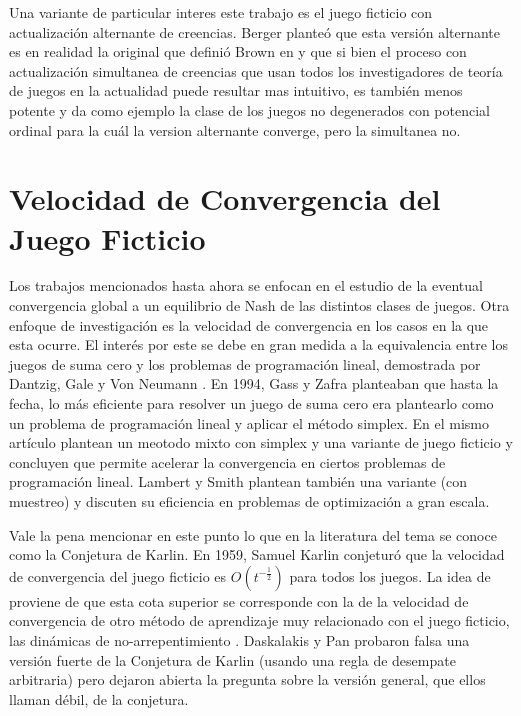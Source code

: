Una variante de particular interes este trabajo es el juego ficticio con actualización alternante de creencias. Berger \cite{browns:original} planteó que esta versión alternante es en realidad la original que definió Brown en \cite{browns:original} y que si bien el proceso con actualización simultanea de creencias que usan todos los investigadores de teoría de juegos en la actualidad puede resultar mas intuitivo, es también menos potente y da como ejemplo la clase de los juegos no degenerados con potencial ordinal para la cuál la version alternante converge, pero la simultanea no.

\section{Velocidad de Convergencia del Juego Ficticio}

Los trabajos mencionados hasta ahora se enfocan en el estudio de la eventual convergencia global a un equilibrio de Nash de las distintos clases de juegos. Otra enfoque de investigación es la velocidad de convergencia en los casos en la que esta ocurre. El interés por este se debe en gran medida a la equivalencia entre los juegos de suma cero y los problemas de programación lineal, demostrada por Dantzig, Gale y Von Neumann \cite{fplp:equiv} \cite{programming:game:equivalence}. En 1994, Gass y Zafra \cite{modified:fp:linear} planteaban que hasta la fecha, lo más eficiente para resolver un juego de suma cero era plantearlo como un problema de programación lineal y aplicar el método simplex. En el mismo artículo plantean un meotodo mixto con simplex y una variante de juego ficticio y concluyen que permite acelerar la convergencia en ciertos problemas de programación lineal. Lambert y Smith \cite{aproach:large:scale} plantean también una variante (con muestreo) y discuten su eficiencia en problemas de optimización a gran escala.

Vale la pena mencionar en este punto lo que en la literatura del tema se conoce como la Conjetura de Karlin. En 1959, Samuel Karlin \cite{karlin:conjecture} conjeturó que la velocidad de convergencia del juego ficticio es $O(t^{-\frac{1}{2}})$ para todos los juegos. La idea de proviene de que esta cota superior se corresponde con la de la velocidad de convergencia de otro método de aprendizaje muy relacionado con el juego ficticio, las dinámicas de no-arrepentimiento \cite{no:regret} \cite{no:regret:2}. Daskalakis y Pan \cite{counter:karlin:strong} probaron falsa una versión fuerte de la Conjetura de Karlin (usando una regla de desempate arbitraria) pero dejaron abierta la pregunta sobre la versión general, que ellos llaman débil, de la conjetura.

